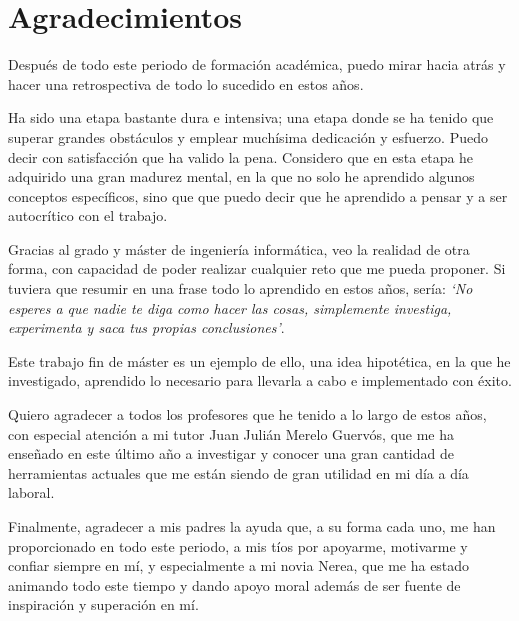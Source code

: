 \thispagestyle{empty}

\section*{Agradecimientos}

Después de todo este periodo de formación académica, puedo mirar hacia atrás y hacer una retrospectiva de todo lo sucedido en estos años.

Ha sido una etapa bastante dura e intensiva; una etapa donde se ha tenido que superar grandes obstáculos y emplear muchísima dedicación y esfuerzo. Puedo decir con satisfacción que ha valido la pena. Considero que en esta etapa he adquirido una gran madurez mental, en la que no solo he aprendido algunos conceptos específicos, sino que que puedo decir que he aprendido a pensar y a ser autocrítico con el trabajo.

Gracias al grado y máster de ingeniería informática, veo la realidad de otra forma, con capacidad de poder realizar cualquier reto que me pueda proponer. Si tuviera que resumir en una frase todo lo aprendido en estos años, sería: \textit{`No esperes a que nadie te diga como hacer las cosas, simplemente investiga, experimenta y saca tus propias conclusiones'}.

Este trabajo fin de máster es un ejemplo de ello, una idea hipotética, en la que he investigado, aprendido lo necesario para llevarla a cabo e implementado con éxito.

Quiero agradecer a todos los profesores que he tenido a lo largo de estos años, con especial atención a mi tutor Juan Julián Merelo Guervós, que me ha enseñado en este último año a investigar y conocer una gran cantidad de herramientas actuales que me están siendo de gran utilidad en mi día a día laboral.

Finalmente, agradecer a mis padres la ayuda que, a su forma cada uno, me han proporcionado
en todo este periodo, a mis tíos por apoyarme, motivarme y confiar siempre en mí, y
especialmente a mi novia Nerea, que me ha estado animando todo este tiempo y dando apoyo
moral además de ser fuente de inspiración y superación en mí.

\newpage
